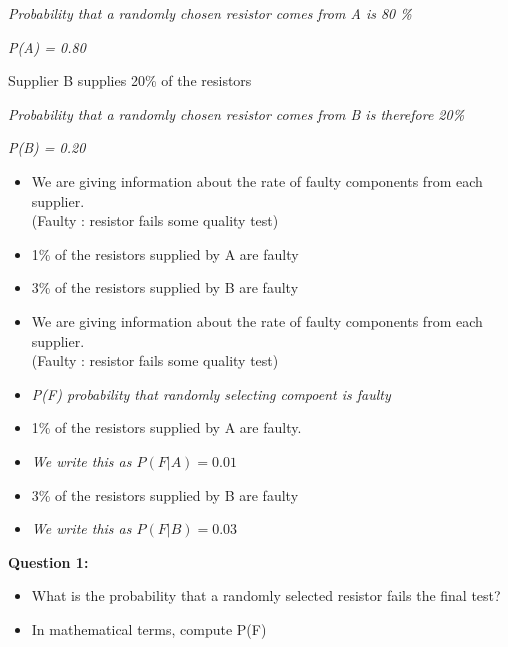 \documentclass[12pt]{report}
\begin{document}
{{\begin{itemize}
{		\item \textit{Probability that a randomly chosen resistor comes from A is 80 \%}
		\item \textit{P(A) = 0.80 }
		
	}
	\item Supplier B supplies 20\% of the resistors
	\item \textit{Probability that a randomly chosen resistor comes from B is therefore 20\%}
	\item \textit{P(B) = 0.20}
\end{itemize}

\Large
\begin{itemize}
	\item We are giving information about the rate of faulty components from each supplier. \\(Faulty : resistor fails some quality test)
	\vspace{1cm}
	\item 1\% of the resistors supplied by A are faulty
	\vspace{1cm}
	\item 3\% of the resistors supplied by B are faulty 
	\vspace{1cm}
\end{itemize}

\Large
\begin{itemize}
	\item We are giving information about the rate of faulty components from each supplier. \\(Faulty : resistor fails some quality test)
	\item  \textit{P(F) probability that randomly selecting compoent is faulty}
	\item 1\% of the resistors supplied by A are faulty.
	\item\textit{ We write this as $P(F|A) =0.01$}
	\item 3\% of the resistors supplied by B are faulty 
	\item \textit{We write this as $P(F|B) =0.03$}
\end{itemize}

\textbf{Question 1:}
\begin{itemize}
	\item What is the probability that a randomly selected resistor fails the final test?
	
	\item In mathematical terms, compute P(F) 
\end{itemize}



}}
\end{document}

